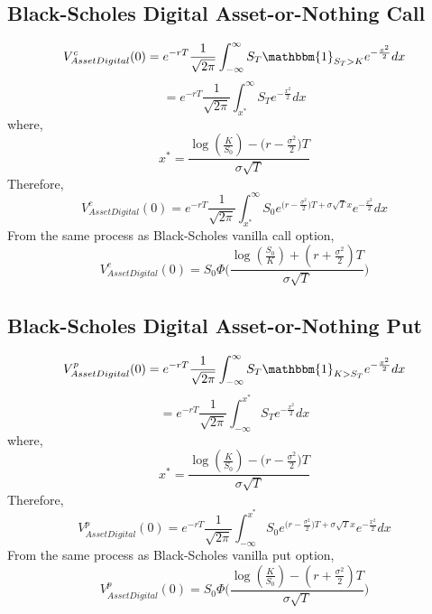 \documentclass[fleqn,12pt]{SelfArx}
\begin{document}
\subsection{Black-Scholes Digital Asset-or-Nothing Call}
$$
V^{c}_{Asset Digital}(0) = e^{-rT}\frac{1}{\sqrt{2\pi}}\int_{-\infty}^{\infty}S_T\mathbbm{1}_{S_T>K}e^{-\frac{x^{2}}{2}}dx
$$
$$
= e^{-rT}\frac{1}{\sqrt{2\pi}}\int_{x^{*}}^{\infty}S_Te^{-\frac{x^{2}}{2}}dx
$$
where,
$$
x^{*} = \frac{\log({\frac{K}{S_0}})-\big(r-\frac{\sigma^{2}}{2}\big)T}{\sigma\sqrt{T}} 
$$
Therefore,
$$
V^{c}_{Asset Digital}(0) = e^{-rT}\frac{1}{\sqrt{2\pi}}\int_{x^{*}}^{\infty}S_0e^{\big(r-\frac{\sigma^{2}}{2}\big)T +\sigma\sqrt{T}x}e^{-\frac{x^{2}}{2}}dx
$$
From the same process as Black-Scholes vanilla call option,
$$
 V^{c}_{Asset Digital}(0) = S_0\Phi\Bigg(\frac{\log({\frac{S_0}{K}})+(r+\frac{\sigma^{2}}{2})T}{\sigma\sqrt{T}} \Bigg)
$$

\subsection{Black-Scholes Digital Asset-or-Nothing Put}
$$
V^{p}_{Asset Digital}(0) = e^{-rT}\frac{1}{\sqrt{2\pi}}\int_{-\infty}^{\infty}S_T\mathbbm{1}_{K>S_T}e^{-\frac{x^{2}}{2}}dx
$$
$$
= e^{-rT}\frac{1}{\sqrt{2\pi}}\int_{-\infty}^{x^{*}}S_Te^{-\frac{x^{2}}{2}}dx
$$
where,
$$
x^{*} = \frac{\log({\frac{K}{S_0}})-\big(r-\frac{\sigma^{2}}{2}\big)T}{\sigma\sqrt{T}} 
$$
Therefore,
$$
V^{p}_{Asset Digital}(0) = e^{-rT}\frac{1}{\sqrt{2\pi}}\int_{-\infty}^{x^{*}}S_0e^{\big(r-\frac{\sigma^{2}}{2}\big)T +\sigma\sqrt{T}x}e^{-\frac{x^{2}}{2}}dx
$$
From the same process as Black-Scholes vanilla put option,
$$
V^{p}_{Asset Digital}(0) = S_0\Phi\Bigg(\frac{\log({\frac{K}{S_0}})-(r+\frac{\sigma^{2}}{2})T}{\sigma\sqrt{T}}\Bigg)
$$
\end{document}
